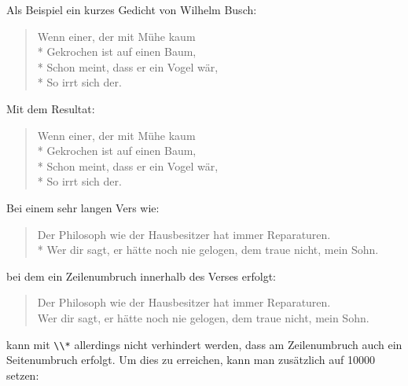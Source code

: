     \begin{Example}
      Als Beispiel ein kurzes Gedicht von Wilhelm Busch:
\begin{lstcode}
  \begin{verse}
    Wenn einer, der mit Mühe kaum\\*
    Gekrochen ist auf einen Baum,\\*
    Schon meint, dass er ein Vogel wär,\\*
    So irrt sich der.
  \end{verse}
\end{lstcode}
      Mit dem Resultat:
      \begin{ShowOutput}
        \begin{verse}
          Wenn einer, der mit Mühe kaum\\*
          Gekrochen ist auf einen Baum,\\*
          Schon meint, dass er ein Vogel wär,\\*
          So irrt sich der.
        \end{verse}
      \end{ShowOutput}
      Bei einem sehr langen Vers wie:
\begin{lstcode}
  \begin{verse}
    Der Philosoph wie der Hausbesitzer hat 
    immer Reparaturen.\\* 
    \bigskip
    Wer dir sagt, er hätte noch nie gelogen, 
    dem traue nicht, mein Sohn.
  \end{verse}
\end{lstcode}
      bei dem ein Zeilenumbruch innerhalb des Verses erfolgt:
      \begin{ShowOutput}
        \begin{verse}
          Der Philosoph wie der Hausbesitzer hat immer Reparaturen.\\
          \bigskip
          Wer dir sagt, er hätte noch nie gelogen, dem traue nicht, mein
          Sohn.
        \end{verse}
      \end{ShowOutput}
      kann mit \verb|\\*| allerdings nicht verhindert werden, dass am
      Zeilenumbruch auch ein Seitenumbruch erfolgt. Um dies zu erreichen, kann
      man zusätzlich  auf
      10000 setzen:
\begin{lstcode}

\end{lstcode}
\end{Example}

